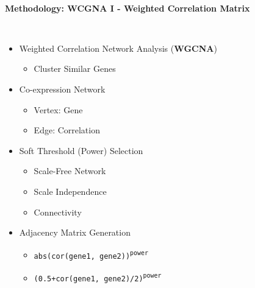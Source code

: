 \documentclass[
11pt,notheorems,hyperref={pdfauthor=whatever}
]{beamer}
\begin{document}
\begin{frame}
    \framesubtitle{Methodology: WCGNA I - Weighted Correlation Matrix}
    \begin{columns}[T,onlytextwidth]
            \begin{itemize}
                \item Weighted Correlation Network Analysis (\textbf{WGCNA}) \cite{langfelder2008wgcna}\cite{zhang2005general}
                \begin{itemize}
                    \item Cluster Similar Genes
                \end{itemize}
                \item Co-expression Network
                \begin{itemize}
                    \item Vertex: Gene
                    \item Edge: Correlation
                \end{itemize}
                \item Soft Threshold (Power) Selection
                \begin{itemize}
                    \item Scale-Free Network
                    \item Scale Independence
                    \item Connectivity
                \end{itemize}
                \item Adjacency Matrix Generation
                \begin{itemize}
                    \item \texttt{abs(cor(gene1, gene2))}\textsuperscript{\texttt{power}}
                    \item \texttt{(0.5+cor(gene1, gene2)/2)}\textsuperscript{\texttt{power}}
                \end{itemize}


\end{itemize}
\end{columns}
\end{frame}
\end{document}
